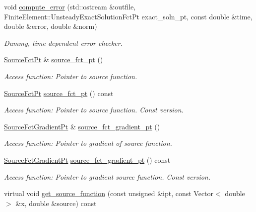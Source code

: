 \begin{DoxyCompactItemize}
void \hyperlink{classoomph_1_1MyBiharmonicEquations_a617b8c8dc3dbac7aeb9d466f6da4edb9}{compute\+\_\+error} (std\+::ostream \&outfile, Finite\+Element\+::\+Unsteady\+Exact\+Solution\+Fct\+Pt exact\+\_\+soln\+\_\+pt, const double \&time, double \&error, double \&norm)
\begin{DoxyCompactList}\small\item\em Dummy, time dependent error checker. \end{DoxyCompactList}\item 
\hyperlink{classoomph_1_1MyBiharmonicEquations_a17bd58054c66229016eb1c52eab36bc1}{Source\+Fct\+Pt} \& \hyperlink{classoomph_1_1MyBiharmonicEquations_afbb201cb342fef337cfce82a776fa2b3}{source\+\_\+fct\+\_\+pt} ()
\begin{DoxyCompactList}\small\item\em Access function\+: Pointer to source function. \end{DoxyCompactList}\item 
\hyperlink{classoomph_1_1MyBiharmonicEquations_a17bd58054c66229016eb1c52eab36bc1}{Source\+Fct\+Pt} \hyperlink{classoomph_1_1MyBiharmonicEquations_a1c2d7933266cf773e3729fb236bc13be}{source\+\_\+fct\+\_\+pt} () const
\begin{DoxyCompactList}\small\item\em Access function\+: Pointer to source function. Const version. \end{DoxyCompactList}\item 
\hyperlink{classoomph_1_1MyBiharmonicEquations_af007c03701e888fed7375cb4537f0046}{Source\+Fct\+Gradient\+Pt} \& \hyperlink{classoomph_1_1MyBiharmonicEquations_a9da77a58e4d4a96e6cfe1eb708bca631}{source\+\_\+fct\+\_\+gradient\+\_\+pt} ()
\begin{DoxyCompactList}\small\item\em Access function\+: Pointer to gradient of source function. \end{DoxyCompactList}\item 
\hyperlink{classoomph_1_1MyBiharmonicEquations_af007c03701e888fed7375cb4537f0046}{Source\+Fct\+Gradient\+Pt} \hyperlink{classoomph_1_1MyBiharmonicEquations_a3c6a713fdc0847a374c58ef4760046ec}{source\+\_\+fct\+\_\+gradient\+\_\+pt} () const
\begin{DoxyCompactList}\small\item\em Access function\+: Pointer to gradient source function. Const version. \end{DoxyCompactList}\item 
virtual void \hyperlink{classoomph_1_1MyBiharmonicEquations_a30d824f604ff00b823238d5b18561693}{get\+\_\+source\+\_\+function} (const unsigned \&ipt, const Vector$<$ double $>$ \&x, double \&source) const

\end{DoxyCompactItemize}
